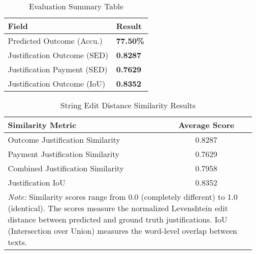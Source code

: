 
\begin{table}[H]
\centering
\caption{Evaluation Summary Table}
\label{tab:evaluation_summary}
\begin{tabular}{@{}lp{2cm}@{}}
\toprule
\textbf{Field} & \textbf{Result} \\
\midrule
Predicted Outcome (Accu.) & \textbf{77.50\%} \\
Justification Outcome (SED) &  \textbf{0.8287} \\
Justification Payment (SED) &  \textbf{0.7629} \\
Justification Outcome (IoU) &  \textbf{0.8352} \\
\bottomrule
\end{tabular}
\end{table}

\begin{table}[H]
\centering
\caption{String Edit Distance Similarity Results}
\label{tab:string_edit_distance_results}
\begin{tabular}{lc}
\toprule
\textbf{Similarity Metric} & \textbf{Average Score} \\
\midrule
Outcome Justification Similarity & 0.8287 \\
Payment Justification Similarity & 0.7629 \\
Combined Justification Similarity & 0.7958 \\
Justification IoU & 0.8352 \\
\midrule
\multicolumn{2}{p{13cm}}{\textit{Note:} Similarity scores range from 0.0 (completely different) to 1.0 (identical). 
The scores measure the normalized Levenshtein edit distance between predicted and ground truth justifications.
IoU (Intersection over Union) measures the word-level overlap between texts.} \\
\bottomrule
\end{tabular}
\end{table}

